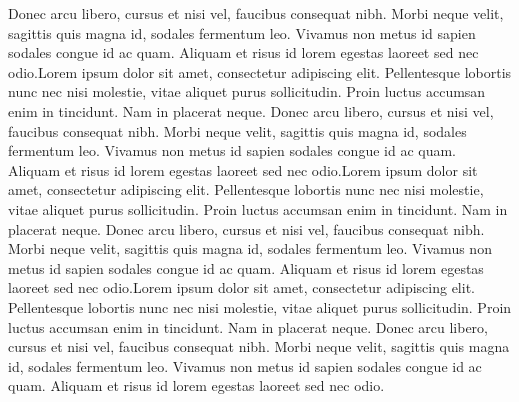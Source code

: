 \documentclass{book}
\begin{document}
Donec arcu libero, cursus et nisi vel, faucibus consequat nibh. Morbi neque velit, sagittis quis magna id, sodales fermentum leo. Vivamus non metus id sapien sodales congue id ac quam. Aliquam et risus id lorem egestas laoreet sed nec odio.Lorem ipsum dolor sit amet, consectetur adipiscing elit. Pellentesque lobortis nunc nec nisi molestie, vitae aliquet purus sollicitudin. Proin luctus accumsan enim in tincidunt. Nam in placerat neque. Donec arcu libero, cursus et nisi vel, faucibus consequat nibh. Morbi neque velit, sagittis quis magna id, sodales fermentum leo. Vivamus non metus id sapien sodales congue id ac quam. Aliquam et risus id lorem egestas laoreet sed nec odio.Lorem ipsum dolor sit amet, consectetur adipiscing elit. Pellentesque lobortis nunc nec nisi molestie, vitae aliquet purus sollicitudin. Proin luctus accumsan enim in tincidunt. Nam in placerat neque. Donec arcu libero, cursus et nisi vel, faucibus consequat nibh. Morbi neque velit, sagittis quis magna id, sodales fermentum leo. Vivamus non metus id sapien sodales congue id ac quam. Aliquam et risus id lorem egestas laoreet sed nec odio.Lorem ipsum dolor sit amet, consectetur adipiscing elit. Pellentesque lobortis nunc nec nisi molestie, vitae aliquet purus sollicitudin. Proin luctus accumsan enim in tincidunt. Nam in placerat neque. Donec arcu libero, cursus et nisi vel, faucibus consequat nibh. Morbi neque velit, sagittis quis magna id, sodales fermentum leo. Vivamus non metus id sapien sodales congue id ac quam. Aliquam et risus id lorem egestas laoreet sed nec odio.
\end{document}
